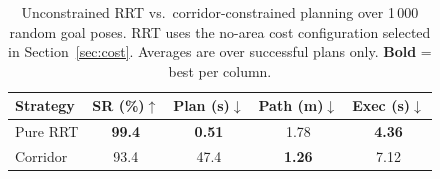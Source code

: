 \begin{table}[!t]
\caption{Unconstrained RRT vs.\ corridor-constrained planning over 1\,000 random
goal poses. RRT uses the no-area cost configuration selected in
Section~\ref{sec:cost}. Averages are over successful plans only.
\textbf{Bold} = best per column.}
\label{tab:rrt-corridor}
\centering
\begin{tabular}{l cccc}
\toprule
Strategy & SR (\%)$\uparrow$ & Plan (s)$\downarrow$ & Path (m)$\downarrow$ & Exec (s)$\downarrow$ \\
\midrule
Pure RRT  & \textbf{99.4} & \textbf{0.51} & 1.78          & \textbf{4.36} \\
Corridor  & 93.4          & 47.4          & \textbf{1.26} & 7.12 \\
\bottomrule
\end{tabular}
\end{table}
